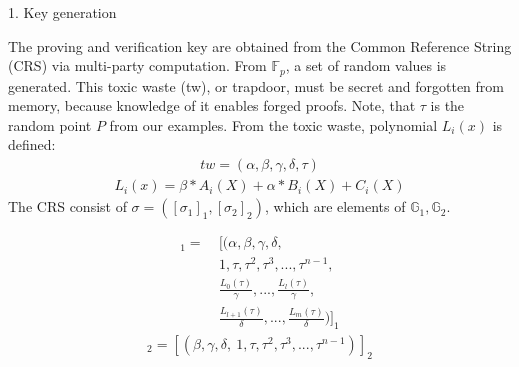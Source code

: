 1. Key generation

The proving and verification key are obtained from the Common Reference String (CRS) via multi-party computation. From \begin{math}\mathbb{F}_p\end{math}, a set of random values is generated. This toxic waste (tw), or trapdoor, must be secret and forgotten from memory, because knowledge of it enables forged proofs. Note, that \begin{math}\tau\end{math} is the random point \(P\) from our examples. From the toxic waste, polynomial \(L_i(x)\) is defined:
\begin{align}
    tw = (\alpha, \beta, \gamma, \delta, \tau) 
\end{align}
\begin{align*}
    L_i(x) = \beta * A_i(X) + \alpha * B_i(X) + C_i(X)
\end{align*}
The CRS consist of \begin{math} \sigma = ([\sigma_1]_1,[\sigma_2]_2)\end{math}, which are elements of \begin{math} \mathbb{G}_1, \mathbb{G}_2\end{math}.

\begin{align}
    [\sigma_1]_1 = 
    &\ [(\alpha, \beta, \gamma, \delta, \\
    &\ 1, \tau, \tau^2, \tau^3, ..., \tau^{n-1}, \\
    &\ \frac{L_0(\tau)}{\gamma}, ..., \frac{L_l(\tau)}{\gamma}, \\
    &\ \frac{L_{l+1}(\tau)}{\delta}, ..., \frac{L_m(\tau)}{\delta})]_1 
\end{align}
\begin{align}
    [\sigma_2]_2 = [(\beta, \gamma, \delta, \ 1, \tau, \tau^2, \tau^3, ..., \tau^{n-1})]_2
\end{align}

